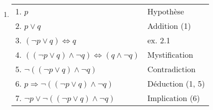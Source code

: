 \begin{enumerate}
	\item  \hspace{1em}
    \begin{center}
    \begin{tabular}{|l|l|}
    \hline
    \hspace{0.5cm} 1. $p$ & Hypothèse \\
    \hspace{0.5cm} 2. $p \lor q$ & Addition (1) \\
    \hspace{0.5cm} 3. $(\neg p \lor q) \Leftrightarrow q$ & ex. 2.1 \\
    \hspace{0.5cm} 4. $((\neg p \lor q) \land \neg q) \Leftrightarrow (q \land \neg q)$ & Mystification \\ 
    \hspace{0.5cm} 5. $\neg ((\neg p \lor q) \land \neg q)$ & Contradiction \\
    6. $p \Rightarrow \neg ((\neg p \lor q) \land \neg q)$ & Déduction (1, 5) \\
    7. $\neg p \lor \neg ((\neg p \lor q) \land \neg q)$ & Implication (6) \\
    \hline
    \end{tabular}
    \end{center}
    
    \end{enumerate}

